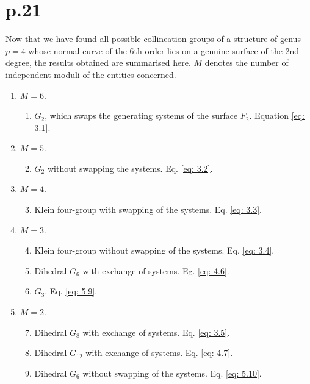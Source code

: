 \documentclass[leqno]{article}
\begin{document}
\section{p.21}
Now that we have found all possible collineation groups of a structure of genus $p=4$ whose normal curve of the 6th order lies on a genuine surface of the 2nd degree, the results obtained are summarised here. $M$ denotes the number of independent moduli of the entities concerned. 
\begin{enumerate}[label=\alph*.]
	\item $M=6$.
	\begin{enumerate}[label=\arabic*)]
		\item $G_2$, which swaps the generating systems of the surface $F_2$. Equation \eqref{eq: 3.1}.
	\end{enumerate}
    \item $M=5$.
    \begin{enumerate}[label=\arabic*)]
    	\setcounter{enumii}{1}
    	\item $G_2$ without swapping the systems. Eq. \eqref{eq: 3.2}.
    \end{enumerate}
    \item $M=4$.
    \begin{enumerate}[label=\arabic*)]
    	\setcounter{enumii}{2}
    	\item Klein four-group with swapping of the systems. Eq. \eqref{eq: 3.3}.
    \end{enumerate}
    \item $M=3$.
    \begin{enumerate}[label=\arabic*)]
    	\setcounter{enumii}{3}
    	\item Klein four-group without swapping of the systems. Eq. \eqref{eq: 3.4}.
    	\item Dihedral $G_6$ with exchange of systems. Eg. \eqref{eq: 4.6}. 
    	\item $G_3$. Eq. \eqref{eq: 5.9}.
    \end{enumerate}
    \item $M=2$.
    \begin{enumerate}[label=\arabic*)]
    	\setcounter{enumii}{6}
    	\item Dihedral $G_8$ with exchange of systems. Eq. \eqref{eq: 3.5}.
    	\item Dihedral $G_{12}$ with exchange of systems. Eq. \eqref{eq: 4.7}.  
    	\item Dihedral $G_6$ without swapping of the systems. Eq. \eqref{eq: 5.10}.

\end{enumerate}
\end{enumerate}
\end{document}
